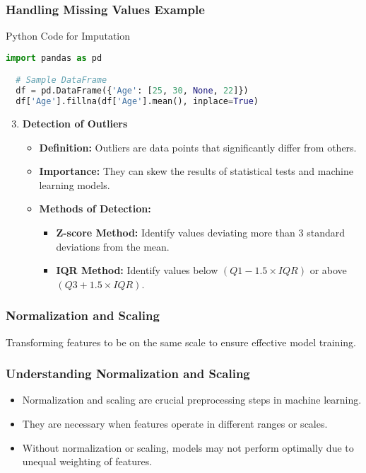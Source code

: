 \documentclass[aspectratio=169]{beamer}
\begin{document}
\begin{frame}[fragile]
  \frametitle{Handling Missing Values Example}
  \begin{block}{Python Code for Imputation}
  \begin{lstlisting}[language=Python]
  import pandas as pd

  # Sample DataFrame
  df = pd.DataFrame({'Age': [25, 30, None, 22]})
  df['Age'].fillna(df['Age'].mean(), inplace=True)
  \end{lstlisting}
  \end{block}

  \begin{enumerate} 
    \setcounter{enumi}{2}
    \item \textbf{Detection of Outliers}
    \begin{itemize}
      \item \textbf{Definition:} Outliers are data points that significantly differ from others.
      \item \textbf{Importance:} They can skew the results of statistical tests and machine learning models.
      \item \textbf{Methods of Detection:}
      \begin{itemize}
        \item \textbf{Z-score Method:} Identify values deviating more than 3 standard deviations from the mean.
        \item \textbf{IQR Method:} Identify values below \((Q1 - 1.5 \times IQR)\) or above \((Q3 + 1.5 \times IQR)\).
      \end{itemize}
    \end{itemize}
  \end{enumerate}
\end{frame}

\begin{frame}
    \frametitle{Normalization and Scaling}
    Transforming features to be on the same scale to ensure effective model training.
\end{frame}

\begin{frame}
    \frametitle{Understanding Normalization and Scaling}
    \begin{itemize}
        \item Normalization and scaling are crucial preprocessing steps in machine learning.
        \item They are necessary when features operate in different ranges or scales.
        \item Without normalization or scaling, models may not perform optimally due to unequal weighting of features.
    \end{itemize}
\end{frame}
\end{document}
